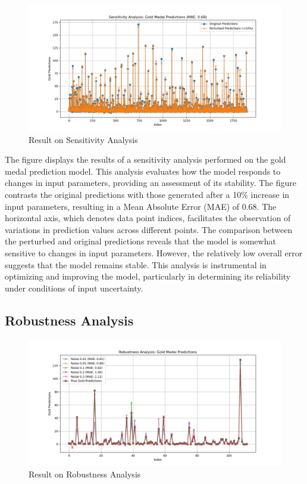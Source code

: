 \documentclass[12pt]{article}
\begin{document}
\begin{figure}[h] 
\centering
\includegraphics[width=17cm]{figure/Sensitivity.png}
\caption{Result on Sensitivity Analysis}
\end{figure}

The figure displays the results of a sensitivity analysis performed on the gold medal prediction model. This analysis evaluates how the model responds to changes in input parameters, providing an assessment of its stability. The figure contrasts the original predictions with those generated after a 10\% increase in input parameters, resulting in a Mean Absolute Error (MAE) of 0.68. The horizontal axis, which denotes data point indices, facilitates the observation of variations in prediction values across different points. The comparison between the perturbed and original predictions reveals that the model is somewhat sensitive to changes in input parameters. However, the relatively low overall error suggests that the model remains stable. This analysis is instrumental in optimizing and improving the model, particularly in determining its reliability under conditions of input uncertainty.

\subsection{Robustness Analysis}

\begin{figure}[h] 
\centering
\includegraphics[width=17cm]{figure/Robustness.png}
\caption{Result on Robustness Analysis}
\end{figure}
\end{document}
